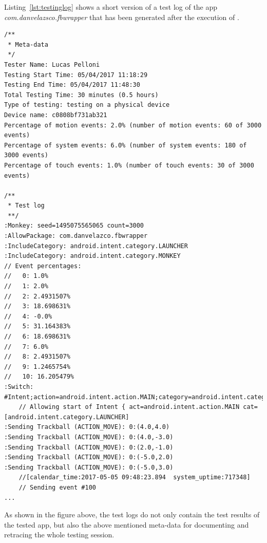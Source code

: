 Listing~\ref{lst:testinglog} shows a short version of a test log of the app \textit{com.danvelazsco.fbwrapper} that has been generated after the execution of \monkey. 

\begin{lstlisting}[caption=Test log of com.danvelazco.fbwrapper, basicstyle=\fontsize{7}{8}\ttfamily,label={lst:testinglog}]
/**
 * Meta-data
 */
Tester Name: Lucas Pelloni
Testing Start Time: 05/04/2017 11:18:29
Testing End Time: 05/04/2017 11:48:30
Total Testing Time: 30 minutes (0.5 hours)
Type of testing: testing on a physical device
Device name: c0808bf731ab321
Percentage of motion events: 2.0% (number of motion events: 60 of 3000 events)
Percentage of system events: 6.0% (number of system events: 180 of 3000 events)
Percentage of touch events: 1.0% (number of touch events: 30 of 3000 events)

/**
 * Test log 
 **/
:Monkey: seed=1495075565065 count=3000
:AllowPackage: com.danvelazco.fbwrapper
:IncludeCategory: android.intent.category.LAUNCHER
:IncludeCategory: android.intent.category.MONKEY
// Event percentages:
//   0: 1.0%
//   1: 2.0%
//   2: 2.4931507%
//   3: 18.698631%
//   4: -0.0%
//   5: 31.164383%
//   6: 18.698631%
//   7: 6.0%
//   8: 2.4931507%
//   9: 1.2465754%
//   10: 16.205479%
:Switch: #Intent;action=android.intent.action.MAIN;category=android.intent.category.LAUNCHER;end
    // Allowing start of Intent { act=android.intent.action.MAIN cat=[android.intent.category.LAUNCHER]
:Sending Trackball (ACTION_MOVE): 0:(4.0,4.0)
:Sending Trackball (ACTION_MOVE): 0:(4.0,-3.0)
:Sending Trackball (ACTION_MOVE): 0:(2.0,-1.0)
:Sending Trackball (ACTION_MOVE): 0:(-5.0,2.0)
:Sending Trackball (ACTION_MOVE): 0:(-5.0,3.0)
    //[calendar_time:2017-05-05 09:48:23.894  system_uptime:717348]
    // Sending event #100
...
\end{lstlisting}

As shown in the figure above, the test logs do not only contain the test results of the tested app, but also the above mentioned meta-data for documenting and retracing the whole testing session.

